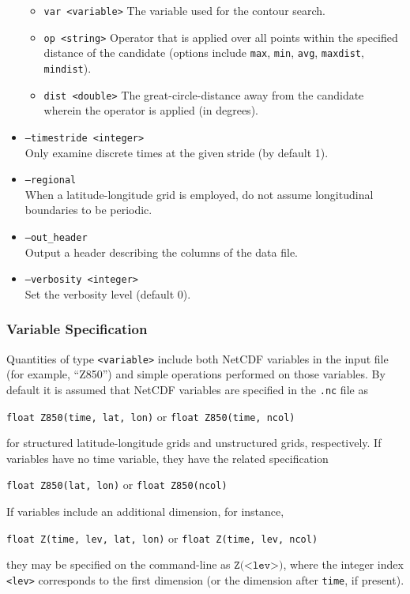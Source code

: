 \documentclass[gmdd, hvmath, online]{copernicus_discussions}
\begin{document}
\begin{itemize}
\begin{itemize}
\item[] \texttt{var <variable>}  The variable used for the contour search.
\item[] \texttt{op <string>}  Operator that is applied over all points within the specified distance of the candidate (options include \texttt{max}, \texttt{min}, \texttt{avg}, \texttt{maxdist}, \texttt{mindist}).
\item[] \texttt{dist <double>}  The great-circle-distance away from the candidate wherein the operator is applied (in degrees).
\end{itemize}
\item[] \texttt{--timestride <integer>} \\ Only examine discrete times at the given stride (by default 1).
\item[] \texttt{--regional} \\ When a latitude-longitude grid is employed, do not assume longitudinal boundaries to be periodic.
\item[] \texttt{--out\_header} \\ Output a header describing the columns of the data file.
\item[] \texttt{--verbosity <integer>} \\ Set the verbosity level (default 0).
\end{itemize}

\subsubsection{Variable Specification} \label{sec:VariableSpecification}

Quantities of type \texttt{<variable>} include both NetCDF variables in the input file (for example, ``Z850'') and simple operations performed on those variables.  By default it is assumed that NetCDF variables are specified in the \texttt{.nc} file as
\begin{center}
\texttt{float Z850(time, lat, lon)} \quad or \quad \texttt{float Z850(time, ncol)}
\end{center} for structured latitude-longitude grids and unstructured grids, respectively.  If variables have no time variable, they have the related specification
\begin{center}
\texttt{float Z850(lat, lon)} \quad or \quad \texttt{float Z850(ncol)}
\end{center}  If variables include an additional dimension, for instance,
\begin{center}
\texttt{float Z(time, lev, lat, lon)} \quad or \quad \texttt{float Z(time, lev, ncol)}
\end{center} they may be specified on the command-line as $\texttt{Z(<lev>)}$, where the integer index \texttt{<lev>} corresponds to the first dimension (or the dimension after \texttt{time}, if present).  
\end{document}
